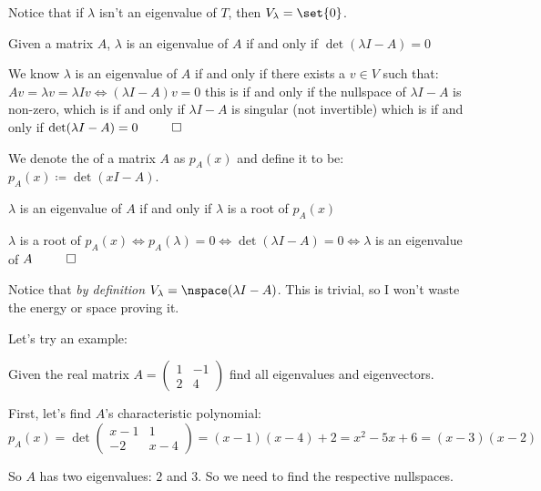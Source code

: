 \documentclass[10pt]{article}
\begin{document}
Notice that if $\lambda$ isn't an eigenvalue of $T$, then $V_\lambda = \set{0}$.

\begin{theorem}{Given a matrix $A$, $\lambda$ is an eigenvalue of $A$ if and only if $\det(\lambda I - A) = 0$}

We know $\lambda$ is an eigenvalue of $A$ if and only if there exists a $v\in V$ such that: $Av=\lambda v = \lambda Iv \iff (\lambda I - A)v = 0$ this is if and only if the nullspace of $\lambda I - A$ is non-zero, which is if and only if $\lambda I - A$ is singular (not invertible) which is if and only if $\det(\lambda I - A) = 0 ~~ \qed$

\end{theorem}

\begin{definition}

We denote the  of a matrix $A$ as $p_A(x)$ and define it to be: $p_A(x) \coloneqq \det(x I - A)$.

\end{definition}

\begin{theorem}{$\lambda$ is an eigenvalue of $A$ if and only if $\lambda$ is a root of $p_A(x)$}

$\lambda$ is a root of $p_A(x) \iff p_A(\lambda) = 0 \iff \det(\lambda I - A) = 0 \iff \lambda$ is an eigenvalue of $A ~~\qed$

\end{theorem}

Notice that \textit{by definition} $V_\lambda = \nspace(\lambda I - A)$. This is trivial, so I won't waste the energy or space proving it.

\separate

Let's try an example:

Given the real matrix $A=\begin{pmatrix} 1 & -1 \\ 2 & 4 \end{pmatrix}$ find all eigenvalues and eigenvectors.

First, let's find $A$'s characteristic polynomial:
\[ p_A(x) = \det\begin{pmatrix} x-1 & 1 \\ -2 & x-4 \end{pmatrix} = (x-1)(x-4) + 2 = x^2 - 5x + 6 = (x-3)(x-2) \]

So $A$ has two eigenvalues: $2$ and $3$. So we need to find the respective nullspaces.
\end{document}
